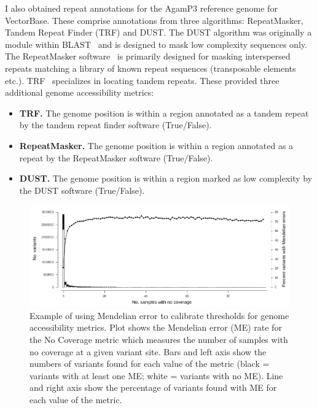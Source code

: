 \begin{refsection}
I also obtained repeat annotations for the AgamP3 reference genome for VectorBase.
%
These comprise annotations from three algorithms: RepeatMasker, Tandem Repeat Finder (TRF) and DUST.
%
The DUST algorithm was originally a module within BLAST~\parencite{Altschul1990} and is designed to mask low complexity sequences only.
%
The RepeatMasker software~\parencite{Smit2013} is primarily designed for masking interspersed repeats matching a library of known repeat sequences (transposable elements etc.).
%
TRF~\parencite{Benson1999} specializes in locating tandem repeats.
%
These provided three additional genome accessibility metrics:
%
\begin{itemize}
%
\item \textbf{TRF.} The genome position is within a region annotated as a tandem repeat by the tandem repeat finder software (True/False).
%
\item \textbf{RepeatMasker.} The genome position is within a region annotated as a repeat by the RepeatMasker software (True/False).
%
\item \textbf{DUST.} The genome position is within a region marked as low complexity by the DUST software (True/False).
%
\end{itemize}


\begin{figure}[t!]
\centering
\includegraphics[width=\textwidth]{artwork/chapter3/me_nodp.pdf}
\caption{Example of using Mendelian error to calibrate thresholds for genome accessibility metrics.
%
Plot shows the Mendelian error (ME) rate for the No Coverage metric which measures the number of samples with no coverage at a given variant site.
%
Bars and left axis show the numbers of variants found for each value of the metric (black = variants with at least one ME; white = variants with no ME).
%
Line and right axis show the percentage of variants found with ME for each value of the metric.
%
}
%
\label{fig:ch3-me_nodp}
\end{figure}



\end{refsection}
